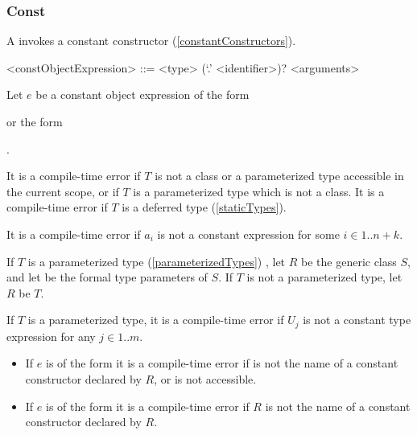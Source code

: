 \documentclass[makeidx]{article}
\begin{document}


\subsubsection{Const}

\LMHash{}%
A  invokes a constant constructor
(\ref{constantConstructors}).

\begin{grammar}
<constObjectExpression> ::= \CONST{} <type> (`.' <identifier>)? <arguments>
\end{grammar}

\LMHash{}%
Let $e$ be a constant object expression of the form

or the form

.

\LMHash{}%
It is a compile-time error if $T$ is not
a class or a parameterized type accessible in the current scope,
or if $T$ is a parameterized type which is not a class.
It is a compile-time error if $T$ is a deferred type
(\ref{staticTypes}).

\LMHash{}%
It is a compile-time error if $a_i$ is not a constant expression
for some $i \in 1 .. n + k$.

\LMHash{}%
If $T$ is a parameterized type (\ref{parameterizedTypes})
,
let $R$ be the generic class $S$,
and let
be the formal type parameters of $S$.
If $T$ is not a parameterized type, let $R$ be $T$.

\LMHash{}%
If $T$ is a parameterized type,
it is a compile-time error if $U_j$ is not a constant type expression for any
$j \in 1 .. m$.

\begin{itemize}
\item
  If $e$ is of the form
  it is a compile-time error if  is not the name of
  a constant constructor declared by $R$, or \id{} is not accessible.
\item
  If $e$ is of the form
  it is a compile-time error if $R$ is not the name of
  a constant constructor declared by $R$.
\end{itemize}
\end{document}
